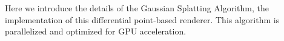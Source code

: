 Here we introduce the details of the Gaussian Splatting Algorithm,
the implementation of this differential point-based renderer. 
This algorithm is parallelized and optimized for GPU acceleration. 
